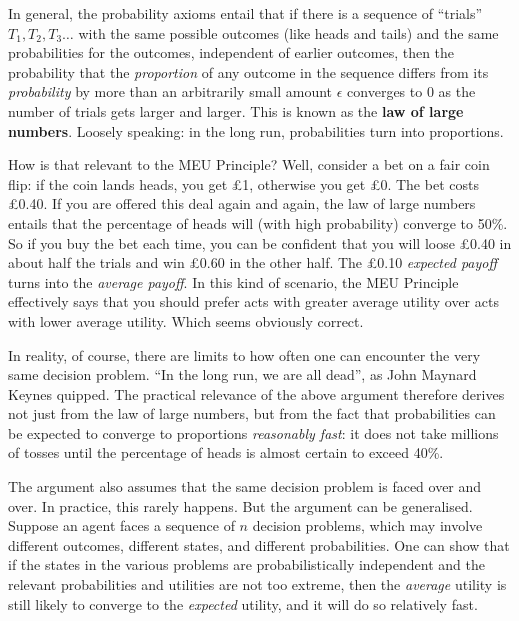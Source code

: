 In general, the probability axioms entail that if there is a sequence
of ``trials'' $T_1,T_2,T_3\ldots$ with the same possible outcomes
(like heads and tails) and the same probabilities for the outcomes,
independent of earlier outcomes, then the probability that the
\emph{proportion} of any outcome in the sequence differs from its
\emph{probability} by more than an arbitrarily small amount $\epsilon$
converges to 0 as the number of trials gets larger and larger. This is
known as the \textbf{law of large numbers}. Loosely speaking: in the
long run, probabilities turn into proportions.

How is that relevant to the MEU Principle? Well, consider a bet on a
fair coin flip: if the coin lands heads, you get £1, otherwise you get
£0. The bet costs £0.40. If you are offered this deal again and again,
the law of large numbers entails that the percentage of heads will
(with high probability) converge to 50\%. So if you buy the bet each
time, you can be confident that you will loose £0.40 in about half the
trials and win £0.60 in the other half. The £0.10 \emph{expected
  payoff} turns into the \emph{average payoff}. In this kind of
scenario, the MEU Principle effectively says that you should prefer
acts with greater average utility over acts with lower average
utility. Which seems obviously correct.

In reality, of course, there are limits to how often one can encounter
the very same decision problem. ``In the long run, we are all dead'',
as John Maynard Keynes quipped. The practical relevance of the above
argument therefore derives not just from the law of large numbers, but
from the fact that probabilities can be expected to converge to
proportions \emph{reasonably fast}: it does not take millions of
tosses until the percentage of heads is almost certain to exceed 40\%.

The argument also assumes that the same decision problem is faced over
and over. In practice, this rarely happens. But the argument can be
generalised. Suppose an agent faces a sequence of $n$ decision
problems, which may involve different outcomes, different states, and
different probabilities. One can show that if the states in the
various problems are probabilistically independent and the relevant
probabilities and utilities are not too extreme, then the
\emph{average} utility is still likely to converge to the
\emph{expected} utility, and it will do so relatively fast.


